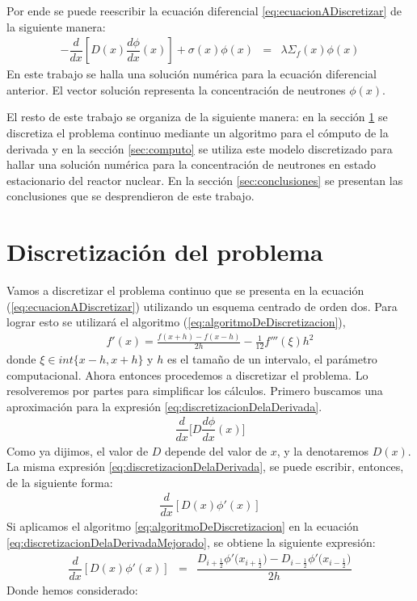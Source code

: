 \documentclass[11pt,a4paper]{emulateapj}
\begin{document}
Por ende se puede reescribir la ecuación diferencial \ref{eq:ecuacionADiscretizar} de la siguiente manera:
\begin{eqnarray}
\label{eq:ecuacionADiscretizarParticular}
  -\dfrac{d}{dx}[D(x) \dfrac{d\phi}{dx}(x)] + \sigma(x) \phi(x)  &=& \lambda  \Sigma_f(x) \phi(x)
\end{eqnarray}
En este trabajo se halla una solución numérica para la ecuación diferencial anterior. El vector solución
representa la concentración de neutrones $\phi(x)$.

El resto de este trabajo se organiza de la siguiente manera: en la sección \ref{sec:discretizacion} se discretiza
el problema continuo mediante un algoritmo para el cómputo de la derivada y en la sección \ref{sec:computo} 
se utiliza este modelo discretizado para hallar una solución numérica para la concentración de neutrones
en estado estacionario del reactor nuclear. En la sección \ref{sec:conclusiones} se presentan las conclusiones
que se desprendieron de este trabajo.

\section{Discretización del problema}
\label{sec:discretizacion}
Vamos a discretizar el problema continuo que se presenta en la ecuación (\ref{eq:ecuacionADiscretizar}) 
utilizando un esquema centrado de orden dos. Para lograr esto se utilizará el algoritmo (\ref{eq:algoritmoDeDiscretizacion}),
\begin{eqnarray}
\label{eq:algoritmoDeDiscretizacion}
	f'(x) = \frac{f(x+h) - f(x-h)}{2h} - \frac{1}{12} f'''(\xi) h^2
\end{eqnarray}
donde $\xi \in int\{x-h,x+h\}$ y $h$ es el tamaño de un intervalo, el parámetro computacional.
Ahora entonces procedemos a discretizar el problema. Lo resolveremos por partes para simplificar los cálculos. Primero buscamos una aproximación para la expresión \ref{eq:discretizacionDelaDerivada}.
\begin{eqnarray}
\label{eq:discretizacionDelaDerivada}
	\dfrac{d}{dx}\bigg[D \dfrac{d\phi}{dx}(x)\bigg]  
\end{eqnarray}
Como ya dijimos, el valor de $D$ depende del valor de $x$, y la denotaremos $D(x)$. La misma expresión \ref{eq:discretizacionDelaDerivada}, se puede escribir, entonces, de la siguiente forma:
\begin{eqnarray}
\label{eq:discretizacionDelaDerivadaMejorado}
	\dfrac{d}{dx}[D(x) \phi'(x)]
\end{eqnarray}
Si aplicamos el algoritmo \ref{eq:algoritmoDeDiscretizacion} en la ecuación \ref{eq:discretizacionDelaDerivadaMejorado}, se obtiene la siguiente expresión:
\begin{eqnarray}
\label{eq:desarrolloDeLaDiscretizacion}
	\dfrac{d}{dx}[D(x) \phi'(x)] &=& \dfrac{D_{i+\frac{1}{2}}\phi'\big(x_{i+\frac{1}{2}}\big)  -  D_{i-\frac{1}{2}}\phi'\big(x_{i-\frac{1}{2}}\big)}     {2h} 
\end{eqnarray}
Donde hemos considerado:
\end{document}
